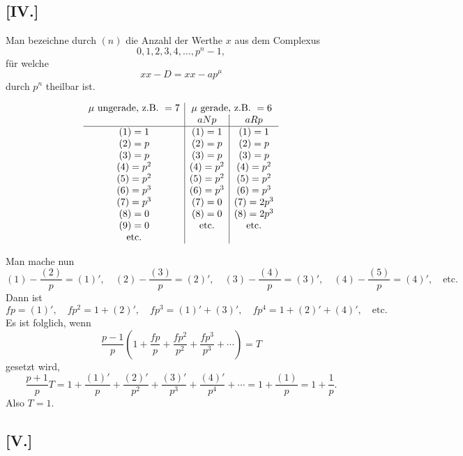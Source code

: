 \documentclass[12pt]{article}
\begin{document}
\subsection*{[IV.]}

Man bezeichne durch $(n)$ die Anzahl der Werthe $x$ aus dem Complexus
\[
0,1,2,3,4,\ldots,p^n-1,
\]
für welche
\[
xx-D=xx-ap^\mu
\]
durch $p^n$ theilbar ist.

\[
\begin{array}{c|c|c}
\mu\ \text{ungerade, z.B. }=7&\multicolumn{2}{c}{\mu\ \text{gerade, z.B. }=6}\\
& aNp&aRp\\ \hline
(1)=1&(1)=1&(1)=1\\
(2)=p&(2)=p&(2)=p\\
(3)=p&(3)=p&(3)=p\\
(4)=p^2&(4)=p^2&(4)=p^2\\
(5)=p^2&(5)=p^2&(5)=p^2\\
(6)=p^3&(6)=p^3&(6)=p^3\\
(7)=p^3&(7)=0&(7)=2p^3\\
(8)=0&(8)=0&(8)=2p^3\\
(9)=0&\text{etc.}&\text{etc.}\\
\text{etc.}&&
\end{array}
\]

Man mache nun
\[
(1)-\frac{(2)}{p}=(1)',\quad
(2)-\frac{(3)}{p}=(2)',\quad
(3)-\frac{(4)}{p}=(3)',\quad
(4)-\frac{(5)}{p}=(4)',\quad\text{etc.}
\]
Dann ist
\[
fp=(1)',\quad
fp^2=1+(2)',\quad
fp^3=(1)'+(3)',\quad
fp^4=1+(2)'+(4)',\quad\text{etc.}
\]
Es ist folglich, wenn
\[
\frac{p-1}{p}\left(1+\frac{fp}{p}+\frac{fp^2}{p^2}+\frac{fp^3}{p^3}+\cdots\right)=T
\]
gesetzt wird,
\[
\frac{p+1}{p}T
=
1+\frac{(1)'}{p}+\frac{(2)'}{p^2}+\frac{(3)'}{p^3}+\frac{(4)'}{p^4}+\cdots
=
1+\frac{(1)}{p}
=
1+\frac1p .
\]
Also $T=1$.

\subsection*{[V.]}
\end{document}
